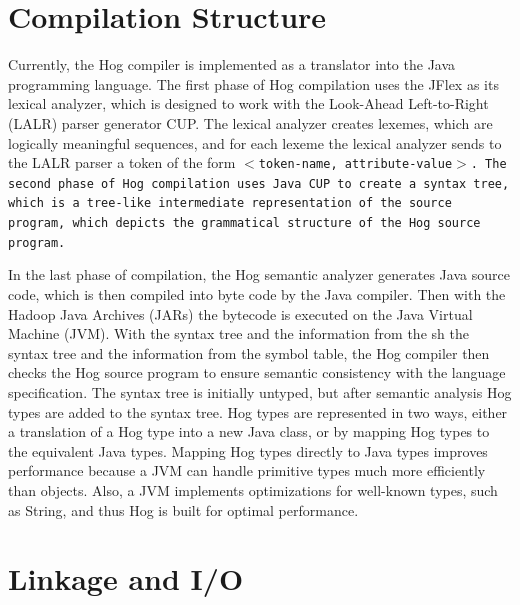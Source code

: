 \documentclass{report}
\begin{document}

\section{Compilation Structure} %
\label{sec:parsing_tools}

Currently, the Hog compiler is implemented as a translator into the Java
programming language. The first phase of Hog compilation uses the JFlex as its
lexical analyzer, which is designed to work with the Look-Ahead Left-to-Right
(LALR) parser generator CUP. The lexical analyzer creates lexemes, which are
logically meaningful sequences, and for each lexeme the lexical analyzer sends
to the LALR parser a token of the form \tt $<$token-name,
attribute-value$>$\rm. The second phase of Hog compilation uses Java CUP to
create a syntax tree, which is a tree-like intermediate representation of the
source program, which depicts the grammatical structure of the Hog source
program.

In the last phase of compilation, the Hog semantic analyzer generates Java source
code, which is then compiled into byte code by the Java compiler. Then with the
Hadoop Java Archives (JARs) the bytecode is executed on the Java Virtual Machine
(JVM). With the syntax tree and the information from the sh the syntax tree and the information from the symbol table, the Hog
compiler then checks the Hog source program to ensure semantic consistency with
the language specification. The syntax tree is initially untyped, but after
semantic analysis Hog types are added to the syntax tree. Hog types are
represented in two ways, either a translation of a Hog type into a new Java class,
or by mapping Hog types to the equivalent Java types. Mapping Hog types directly
to Java types improves performance because a JVM can handle primitive types much
more efficiently than objects. Also, a JVM implements optimizations for well-known
types, such as String, and thus Hog is built for optimal performance.


\section{Linkage and I/O} %
\label{sec:linkage_and_i_o}
\end{document}
